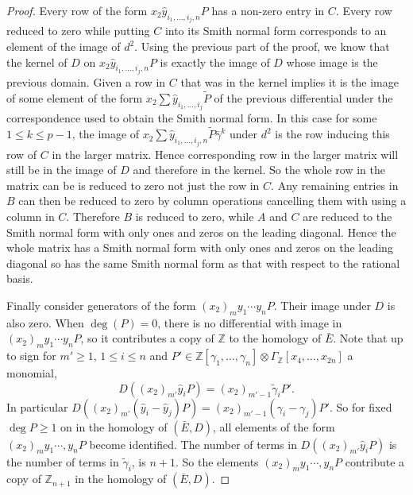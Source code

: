\documentclass{article}
\theoremstyle{plain}
\theoremstyle{definition}
\numberwithin{thm}{section}
\begin{document}
\begin{proof}
				Every row of the form $x_2\hat{y}_{i_1,\dots,i_j,n}P$ has a non-zero entry in $C$.
				Every row reduced to zero while putting $C$
				into its Smith normal form corresponds to an element of the image of $d^2$.
				Using the previous part of the proof, we know that the kernel of $D$ on $x_2\hat{y}_{i_1,\dots,i_j,n}P$ is exactly the image of $D$
				whose image is the previous domain.
				Given a row in $C$ that was in the kernel implies it is the image of some element of the form $x_2\sum{\hat{y}_{i_1,\dots,i_{j}}\tilde{P}}$
				of the previous differential under the correspondence used to obtain the Smith normal form.
				In this case for some $1\leq k\leq p-1$, the image of $x_2\sum{\hat{y}_{i_1,\dots,i_{j},n}\tilde{P}\bar{\gamma}^k}$
				under $d^2$ is the row inducing this row of $C$ in the larger matrix.
				Hence corresponding row in the larger matrix will still be in the image of $D$ and therefore in the kernel.
				So the whole row in the matrix can be is reduced to zero not just the row in $C$.
				Any remaining entries in $B$ can then be reduced to zero by column operations cancelling them with using a column in $C$.
				Therefore $B$ is reduced to zero, while $A$ and $C$ are reduced to the Smith normal form with only ones and zeros on the leading diagonal. 
				Hence the whole matrix has a Smith normal form with only ones and zeros on the leading diagonal
				so has the same Smith normal form as that with respect to the rational basis.
				
				
				Finally consider generators of the form $(x_2)_m y_1\cdots y_n P$. Their image under $D$ is also zero.
				When $\deg(P)=0$, there is no differential with image in $(x_2)_m y_1\cdots y_n P$, so it contributes a copy of $\mathbb{Z}$ to the homology of $\bar{E}$.
				Note that up to sign for $m'\geq 1$, $1\leq i\leq n$ and
				$P'\in\mathbb{Z}[\gamma_1,\dots,\gamma_n]\otimes\Gamma_\mathbb{Z}[x_4,\dots,x_{2n}]$ a monomial,
				\begin{equation*}
					D((x_2)_{m'}\hat{y}_i P)=(x_2)_{{m'}-1}\tilde{\gamma}_i P'.
				\end{equation*}
				In particular $D((x_2)_{m'}(\hat{y}_i-\hat{y}_j)P)=(x_2)_{m'-1}(\gamma_i-\gamma_j)P'$.
				So for fixed $\deg{P}\geq 1$ on in the homology of $(\bar{E},D)$, all elements of the form $(x_2)_m y_1\cdots,y_n P$ become identified.
				The number of terms in $D((x_2)_{m'}\hat{y}_i P)$ is the number of terms in $\tilde{\gamma}_i$, is $n+1$.
				So the elements $(x_2)_m y_1\cdots,y_n P$ contribute a copy of $\mathbb{Z}_{n+1}$ in the homology of $(\bar{E},D)$.
			\end{proof}
			
\end{document}
